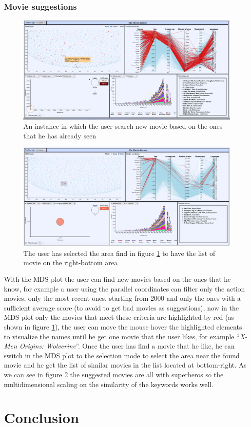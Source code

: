 \documentclass[]{article}
\newcommand{\quotes}[1]{``#1''}
\begin{document}
\subsubsection{Movie suggestions}
\begin{figure}[H]
	\centering
	\includegraphics[width=1\linewidth]{images/insights_suggestion1}
	\caption{An instance in which the user search new movie based on the ones that he has already seen}
	\label{fig:insightssuggestion}
\end{figure}
\begin{figure}[H]
	\centering
	\includegraphics[width=1\linewidth]{images/insights_suggestion2}
	\caption{The user has selected the area find in figure \ref{fig:insightssuggestion} to have the list of movie on the right-bottom area}
	\label{fig:insightssuggestion2}
\end{figure}
With the MDS plot the user can find new movies based on the ones that he know, for example a user using the parallel coordinates can filter only the action movies, only the most recent ones, starting from 2000 and only the ones with a sufficient average score (to avoid to get bad movies as suggestions), now in the MDS plot only the movies that meet these criteria are highlighted by red (as shown in figure \ref{fig:insightssuggestion}), the user can move the mouse hover the highlighted elements to visualize the names until he get one movie that the user likes, for example \quotes{\emph{X-Men Origins: Wolverine}}.\newline
Once the user has find a movie that he like, he can switch in the MDS plot to the selection mode to select the area near the found movie and he get the list of similar movies in the list located at bottom-right.\newline
As we can see in figure \ref{fig:insightssuggestion2} the suggested movies are all with superheros so the multidimensional scaling on the similarity of the keywords works well.


\section{Conclusion}
\end{document}
